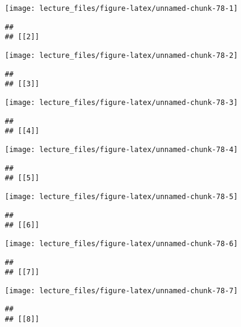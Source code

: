 \documentclass[
]{book}
\begin{document}
\begin{center}\texttt{[image: lecture\_files/figure-latex/unnamed-chunk-78-1]} \end{center}

\begin{verbatim}
## 
## [[2]]
\end{verbatim}

\begin{center}\texttt{[image: lecture\_files/figure-latex/unnamed-chunk-78-2]} \end{center}

\begin{verbatim}
## 
## [[3]]
\end{verbatim}

\begin{center}\texttt{[image: lecture\_files/figure-latex/unnamed-chunk-78-3]} \end{center}

\begin{verbatim}
## 
## [[4]]
\end{verbatim}

\begin{center}\texttt{[image: lecture\_files/figure-latex/unnamed-chunk-78-4]} \end{center}

\begin{verbatim}
## 
## [[5]]
\end{verbatim}

\begin{center}\texttt{[image: lecture\_files/figure-latex/unnamed-chunk-78-5]} \end{center}

\begin{verbatim}
## 
## [[6]]
\end{verbatim}

\begin{center}\texttt{[image: lecture\_files/figure-latex/unnamed-chunk-78-6]} \end{center}

\begin{verbatim}
## 
## [[7]]
\end{verbatim}

\begin{center}\texttt{[image: lecture\_files/figure-latex/unnamed-chunk-78-7]} \end{center}

\begin{verbatim}
## 
## [[8]]
\end{verbatim}
\end{document}
